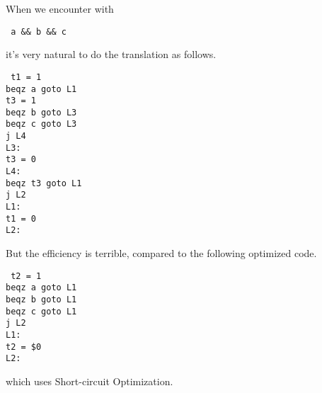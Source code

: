 \documentclass[journal]{IEEEtran}
\begin{document}
When we encounter with 
\begin{center}
\texttt{
a \&\& b \&\& c
}
\end{center}
it's very natural to do the translation as follows.
\begin{center}
\texttt{
t1 = 1 \ \ \ \ \ \ \ \ \ \ \ \\
	beqz a goto L1 \ \ \\
	t3 = 1 \ \ \ \ \ \ \ \ \ \ \\
	beqz b goto L3 \ \ \\
 	beqz c goto L3 \ \ \\
	j L4 \ \ \ \ \ \ \ \ \ \ \ \ \\
L3: \ \ \ \ \ \ \ \ \ \ \ \ \ \ \ \ \ \ \ \ \\
	t3 = 0 \ \ \ \ \ \ \ \ \ \ \\
L4: \ \ \ \ \ \ \ \ \ \ \ \ \ \ \ \ \ \ \ \ \\
beqz t3 goto L1 \\
	j L2 \ \ \ \ \ \ \ \ \ \ \ \ \\
L1: \ \ \ \ \ \ \ \ \ \ \ \ \ \ \ \ \ \ \ \ \\
	t1 = 0 \ \ \ \ \ \ \ \ \ \ \\
L2: \ \ \ \ \ \ \ \ \ \ \ \ \ \ \ \ \ \ \ \ \\
}
\end{center}
But the efficiency is terrible, compared to the following optimized code.
\begin{center}
\texttt{
t2 = 1 \ \ \ \ \ \ \ \ \ \  \\
beqz a goto L1 \\
	beqz b goto L1 \\
 	beqz c goto L1 \\
	j L2\ \ \ \ \ \ \ \ \ \ \ \ \\ 
L1: \ \ \ \ \ \ \ \ \ \ \ \ \ \ \ \ \ \ \\
	t2 = \$0 \ \ \ \ \ \ \ \ \\
L2:\ \ \ \ \ \ \ \ \ \ \ \ \ \ \ \ \ \ \ \\
}
\end{center}	
which uses Short-circuit Optimization.



\end{document}
